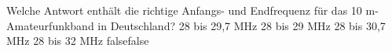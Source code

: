     {Welche Antwort enthält die richtige Anfangs- und Endfrequenz für das 10 m-Amateurfunkband in Deutschland?}
    {28 bis 29,7 MHz}
    {28 bis 29 MHz}
    {28 bis 30,7 MHz}
    {28 bis 32 MHz}
    {false}{false}